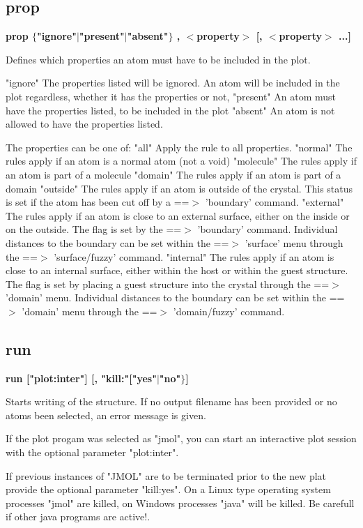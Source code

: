 \subsection*{prop}
{\bf prop $ \{$"ignore"$| $"present"$| $"absent"$\} $ , $ <$property$> $ [, $ <$property$> $ ...] \par }
\par
\vspace{3pt}
Defines which properties an atom must have to be included in the plot. 
\par
"ignore" 
The properties listed will be ignored. An atom will be included in 
the plot regardless, whether it has the properties or not, 
"present" 
An atom must have the properties listed, to be included in the plot 
"absent" 
An atom is not allowed to have the properties listed. 
\par
The properties can be one of: 
"all" 
Apply the rule to all properties. 
"normal" 
The rules apply if an atom is a normal atom (not a void) 
"molecule" 
The rules apply if an atom is part of a molecule 
"domain" 
The rules apply if an atom is part of a domain 
"outside" 
The rules apply if an atom is outside of the crystal. This status 
is set if the atom has been cut off by a ==$> $ 'boundary' command. 
"external" 
The rules apply if an atom is close to an external surface, either 
on the inside or on the outside. 
The flag is set by the ==$> $ 'boundary' command. Individual distances 
to the boundary can be set within the ==$> $ 'surface' menu through 
the ==$> $ 'surface/fuzzy' command. 
"internal" 
The rules apply if an atom is close to an internal surface, either 
within the host or within the guest structure. 
The flag is set by placing a guest structure into the crystal through 
the ==$> $ 'domain' menu. Individual distances 
to the boundary can be set within the ==$> $ 'domain' menu through 
the ==$> $ 'domain/fuzzy' command. 
\subsection*{run}
{\bf run  ["plot:inter"] [, "kill:"["yes"$| $"no"$\} $] \par }
\par
\vspace{3pt}
Starts writing of the structure. If no output filename has been provided 
or no atoms been selected, an error message is given. 
\par
If the plot progam was selected as "jmol", you can start an 
interactive plot session with the optional parameter "plot:inter". 
\par
If previous instances of "JMOL" are to be terminated prior to the 
new plat provide the optional parameter "kill:yes". 
On a Linux type operating system processes "jmol" are killed, 
on Windows processes "java" will be killed. Be carefull if other 
java programs are active!. 
